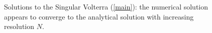 \documentclass[10pt]{article}
\begin{document}
\begin{figure}[H]
    \centering
    \hfill
    \caption{Solutions to the Singular Volterra (\ref{main}): the numerical solution appears to converge to the analytical solution with increasing resolution $N$.}
    \label{fig:num1}
\end{figure}
\end{document}
